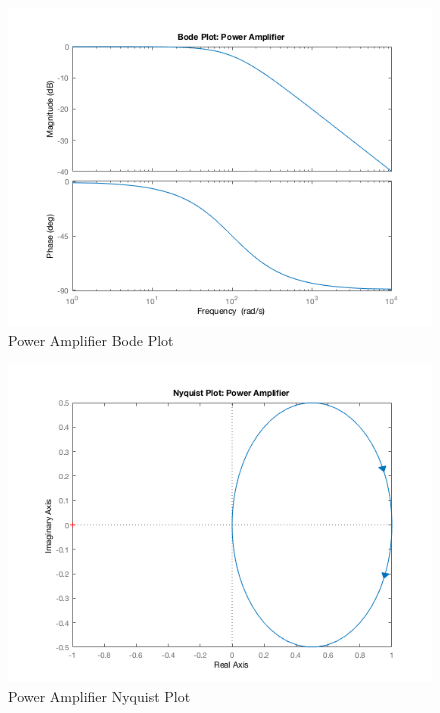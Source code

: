 \documentclass[12pt]{article}
\begin{document}
\begin{figure}[H]
\begin{center}
	\includegraphics[width=\textwidth]{./img/AmpBode.png}
	\caption{\label{fig:ampbode}Power Amplifier Bode Plot}
\end{center}
\end{figure}

\begin{figure}[H]
\begin{center}
	\includegraphics[width=\textwidth]{./img/AmpNyquist.png}
	\caption{\label{fig:ampnyquist}Power Amplifier Nyquist Plot}
\end{center}
\end{figure}
\end{document}
